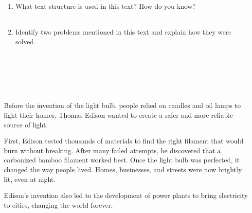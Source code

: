\documentclass[12pt]{article}
\begin{document}
\begin{tcolorbox}[colframe=black!60, colback=white, 
coltitle=black, colbacktitle=black!15, fonttitle=\bfseries\Large, 
title=Guided Practice, halign title=center, left=10pt, right=10pt, top=10pt, bottom=15pt]
\begin{enumerate}[itemsep=3em]
    \item What text structure is used in this text? How do you know? 
    \\[1em] \underline{\hspace{15cm}}
    \\[1em] \underline{\hspace{15cm}}
    \item Identify two problems mentioned in this text and explain how they were solved.
       \\[1em] \underline{\hspace{15cm}}
    \\[1em] \underline{\hspace{15cm}}
       \\[1em] \underline{\hspace{15cm}}
    \\[1em] \underline{\hspace{15cm}}
       \\[1em] \underline{\hspace{15cm}}
    \\[1em] \underline{\hspace{15cm}}
    
\end{enumerate}
\end{tcolorbox}

\vspace{1em}

\begin{tcolorbox}[colframe=black!60, colback=white, 
coltitle=black, colbacktitle=black!15, fonttitle=\bfseries\Large, 
title=Text: The Invention of the Light Bulb, halign title=center, left=10pt, right=10pt, top=10pt, bottom=15pt]
Before the invention of the light bulb, people relied on candles and oil lamps to light their homes. Thomas Edison wanted to create a safer and more reliable source of light. 

First, Edison tested thousands of materials to find the right filament that would burn without breaking. After many failed attempts, he discovered that a carbonized bamboo filament worked best. Once the light bulb was perfected, it changed the way people lived. Homes, businesses, and streets were now brightly lit, even at night. 

Edison’s invention also led to the development of power plants to bring electricity to cities, changing the world forever.
\end{tcolorbox}
\end{document}
